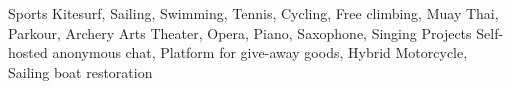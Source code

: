 
\begin{cvskills}

\vspace{0.4cm}
\cvskill
{Sports}
{Kitesurf, Sailing, Swimming, Tennis, Cycling, Free climbing, Muay Thai, Parkour, Archery}
\vspace{0.4cm}
\cvskill
{Arts}
{Theater, Opera, Piano, Saxophone, Singing} %
\vspace{0.4cm}
\cvskill
{Projects}
{Self-hosted anonymous chat, Platform for give-away goods, Hybrid Motorcycle, Sailing boat restoration} %
\end{cvskills}